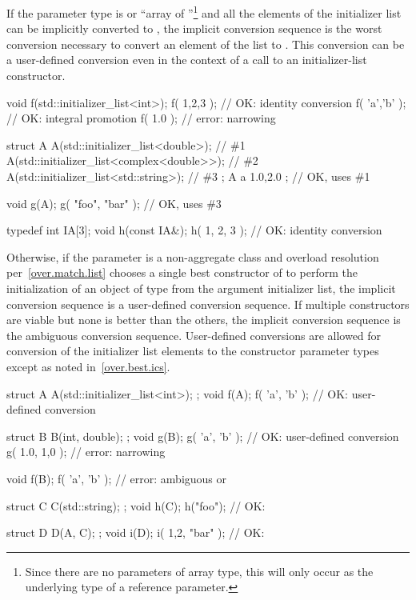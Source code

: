\pnum
If the parameter type is  or
``array of ''\footnote{Since there are no parameters of array type,
this will only occur as the underlying type of a reference parameter.}
and all the elements
of the initializer list can be implicitly converted to , the implicit
conversion sequence is the worst conversion necessary to convert an element of
the list to . This conversion can be a user-defined conversion even in
the context of a call to an initializer-list constructor. \enterexample
\begin{codeblock}
void f(std::initializer_list<int>);
f( {1,2,3} );               // OK:  identity conversion
f( {'a','b'} );             // OK:  integral promotion
f( {1.0} );                 // error: narrowing

struct A {
  A(std::initializer_list<double>);           // \#1
  A(std::initializer_list<complex<double>>);  // \#2
  A(std::initializer_list<std::string>);      // \#3
};
A a{ 1.0,2.0 };             // OK, uses \#1

void g(A);
g({ "foo", "bar" });        // OK, uses \#3

typedef int IA[3];
void h(const IA&);
h({ 1, 2, 3 });             // OK: identity conversion
\end{codeblock}
\exitexample

\pnum
Otherwise, if the parameter is a non-aggregate class  and overload
resolution per~\ref{over.match.list} chooses a single best constructor of
 to perform the initialization of an object of type  from the
argument initializer list, the implicit conversion sequence is a user-defined
conversion sequence. If multiple constructors are viable but none is better than
the others, the implicit conversion sequence is the ambiguous conversion
sequence. User-defined conversions are allowed for conversion of the initializer
list elements to the constructor parameter types except as noted
in~\ref{over.best.ics}. \enterexample
\begin{codeblock}
struct A {
  A(std::initializer_list<int>);
};
void f(A);
f( {'a', 'b'} );            // OK:  user-defined conversion

struct B {
  B(int, double);
};
void g(B);
g( {'a', 'b'} );            // OK:  user-defined conversion
g( {1.0, 1,0} );            // error: narrowing

void f(B);
f( {'a', 'b'} );            // error: ambiguous  or 

struct C {
  C(std::string);
};
void h(C);
h({"foo"});                 // OK: 

struct D {
  D(A, C);
};
void i(D);
i({ {1,2}, {"bar"} });      // OK: 
\end{codeblock}
\exitexample

